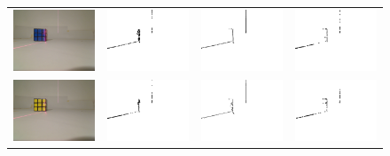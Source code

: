 \documentclass[ngerman,a4paper,parskip=half]{scrartcl}
\begin{document}
\begin{figure}[H]
\begin{tabular}{c|c|c|c}
		\includegraphics[width=.22\textwidth]{includes/blue_0.png} &
		\includegraphics[width=.22\textwidth]{includes/blue_0_diff.png} &
		\includegraphics[width=.22\textwidth]{includes/blue_0_free.png} &
		\includegraphics[width=.22\textwidth]{includes/blue_0_peak.png} \\
		
		\includegraphics[width=.22\textwidth]{includes/yellow_0.png} & 
		\includegraphics[width=.22\textwidth]{includes/yellow_0_diff.png} &
		\includegraphics[width=.22\textwidth]{includes/yellow_0_free.png} &
		\includegraphics[width=.22\textwidth]{includes/yellow_0_peak.png} \\
		

\end{tabular}
\end{figure}
\end{document}
